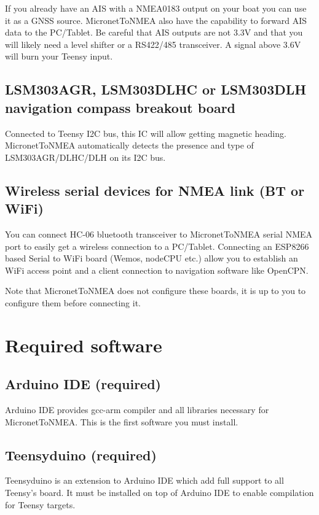 \documentclass{report}
\begin{document}
If you already have an AIS with a NMEA0183 output on your boat you can use it as a GNSS source. MicronetToNMEA also have the capability to forward AIS data to the PC/Tablet. Be careful that AIS outputs are not 3.3V and that you will likely need a level shifter or a RS422/485 transceiver. A signal above 3.6V will burn your Teensy input.

\subsection{LSM303AGR, LSM303DLHC or LSM303DLH navigation compass breakout board}

Connected to Teensy I2C bus, this IC will allow getting magnetic heading. MicronetToNMEA automatically detects the presence and type of LSM303AGR/DLHC/DLH on its I2C bus.

\subsection{Wireless serial devices for NMEA link (BT or WiFi)}

You can connect HC-06 bluetooth transceiver to MicronetToNMEA serial NMEA port to easily get a wireless connection to a PC/Tablet. Connecting an ESP8266 based Serial to WiFi board (Wemos, nodeCPU etc.) allow you to establish an WiFi access point and a client connection to navigation software like OpenCPN.

Note that MicronetToNMEA does not configure these boards, it is up to you to configure them before connecting it.

\section{Required software}

\subsection{Arduino IDE (required)}
Arduino IDE provides gcc-arm compiler and all libraries necessary for MicronetToNMEA. This is the first software you must install.

\subsection{Teensyduino (required)}

Teensyduino is an extension to Arduino IDE which add full support to all Teensy’s board. It must be installed on top of Arduino IDE to enable compilation for Teensy targets.
\end{document}
